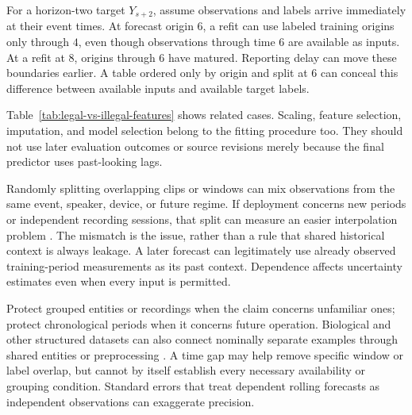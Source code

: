 For a horizon-two target $Y_{s+2}$, assume observations and labels arrive immediately at their event times. At forecast origin $6$, a refit can use labeled training origins only through $4$, even though observations through time $6$ are available as inputs. At a refit at $8$, origins through $6$ have matured. Reporting delay can move these boundaries earlier. A table ordered only by origin and split at $6$ can conceal this difference between available inputs and available target labels.

Table~\ref{tab:legal-vs-illegal-features} shows related cases. Scaling, feature selection, imputation, and model selection belong to the fitting procedure too. They should not use later evaluation outcomes or source revisions merely because the final predictor uses past-looking lags.

Randomly splitting overlapping clips or windows can mix observations from the same event, speaker, device, or future regime. If deployment concerns new periods or independent recording sessions, that split can measure an easier interpolation problem \citep{roberts2017}. The mismatch is the issue, rather than a rule that shared historical context is always leakage. A later forecast can legitimately use already observed training-period measurements as its past context. Dependence affects uncertainty estimates even when every input is permitted.

Protect grouped entities or recordings when the claim concerns unfamiliar ones; protect chronological periods when it concerns future operation. Biological and other structured datasets can also connect nominally separate examples through shared entities or preprocessing \citep{bernett2024}. A time gap may help remove specific window or label overlap, but cannot by itself establish every necessary availability or grouping condition. Standard errors that treat dependent rolling forecasts as independent observations can exaggerate precision.

